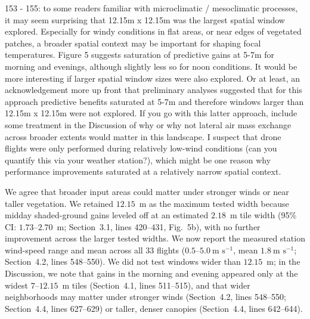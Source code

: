 \documentclass[12pt,english]{reviewresponse}
\begin{document}
\begin{revcomment}
153 - 155: to some readers familiar with microclimatic / mesoclimatic processes, it may seem surprising that 12.15m x 12.15m was the largest spatial window explored. Especially for windy conditions in flat areas, or near edges of vegetated patches, a broader spatial context may be important for shaping focal temperatures. Figure 5 suggests saturation of predictive gains at 5-7m for morning and evenings, although slightly less so for noon conditions. It would be more interesting if larger spatial window sizes were also explored. Or at least, an acknowledgement more up front that preliminary analyses suggested that for this approach predictive benefits saturated at 5-7m and therefore windows larger than 12.15m x 12.15m were not explored. If you go with this latter approach, include some treatment in the Discussion of why or why not lateral air mass exchange across broader extents would matter in this landscape. I suspect that drone flights were only performed during relatively low-wind conditions (can you quantify this via your weather station?), which might be one reason why performance improvements saturated at a relatively narrow spatial context.
\end{revcomment}

\begin{revresponse}
We agree that broader input areas could matter under stronger winds or near taller vegetation. We retained $12.15$~m as the maximum tested width because midday shaded-ground gains leveled off at an estimated $2.18$~m tile width (95\% CI: $1.73\text{--}2.70$~m; Section~3.1, lines 420--431, Fig.~5b), with no further improvement across the larger tested widths. We now report the measured station wind-speed range and mean across all 33 flights ($0.5\text{--}5.0~\text{m s}^{-1}$, mean $1.8~\text{m s}^{-1}$; Section~4.2, lines 548--550). We did not test windows wider than $12.15$~m; in the Discussion, we note that gains in the morning and evening appeared only at the widest $7\text{--}12.15$~m tiles (Section~4.1, lines 511--515), and that wider neighborhoods may matter under stronger winds (Section~4.2, lines 548--550; Section~4.4, lines 627--629) or taller, denser canopies (Section~4.4, lines 642--644).
\end{revresponse}
\end{document}
